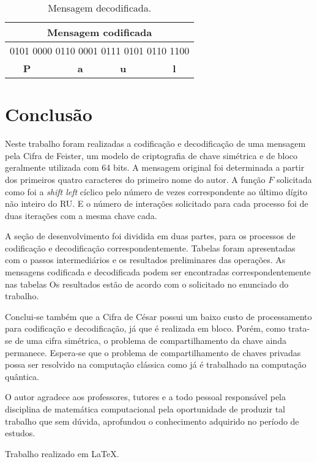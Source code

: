 \documentclass[a4paper,pra,aps,twocolumn,superscriptaddress,10pt,final]{revtex4-2}
\begin{document}
    \begin{table}[!htpb]
        \caption{Mensagem decodificada.}
        \label{tab:tab9-mens-deco}
        \begin{tabular}{|c|}
            \hline
            \textbf{Mensagem codificada}                      \\ \hline
            0101 0000 0110 0001 0111 0101 0110 1100           \\ \hline
            \textbf{P $\qquad \quad \quad$ a $\quad \qquad$ u $\qquad \quad \quad$ l} \\ \hline
        \end{tabular}%
    \end{table}

\section{Conclusão}
\label{sec:conclusion}
    
    Neste trabalho foram realizadas a codificação e decodificação de uma mensagem pela Cifra de Feister, um modelo de criptografia de chave simétrica e de bloco geralmente utilizada com 64 bits. A mensagem original foi determinada a partir dos primeiros quatro caracteres do primeiro nome do autor. A função $F$ solicitada como foi a \textit{shift left} cíclico pelo número de vezes correspondente ao último dígito não inteiro do RU. E o número de interações solicitado para cada processo foi de duas iterações com a mesma chave cada.
    
    A seção de desenvolvimento foi dividida em duas partes, para os processos de codificação e decodificação correspondentemente. Tabelas foram apresentadas com o passos intermediários e os resultados preliminares das operações. As mensagens codificada e decodificada podem ser encontradas correspondentemente nas tabelas Os resultados estão de acordo com o solicitado no enunciado do trabalho.

    Conclui-se também que a Cifra de César possui um baixo custo de processamento para codificação e decodificação, já que é realizada em bloco. Porém, como trata-se de uma cifra simétrica, o problema de  compartilhamento da chave ainda permanece. Espera-se que o problema de compartilhamento de chaves privadas possa ser resolvido na computação clássica como já é trabalhado na computação quântica.

    \vspace{-0.5cm}

    \begin{acknowledgments}
        O autor agradece aos professores, tutores e a todo pessoal responsável pela disciplina de matemática computacional pela oportunidade de produzir tal trabalho que sem dúvida, aprofundou o conhecimento adquirido no período de estudos.    

        Trabalho realizado em \LaTeX.
    \end{acknowledgments}
% 
\end{document}
